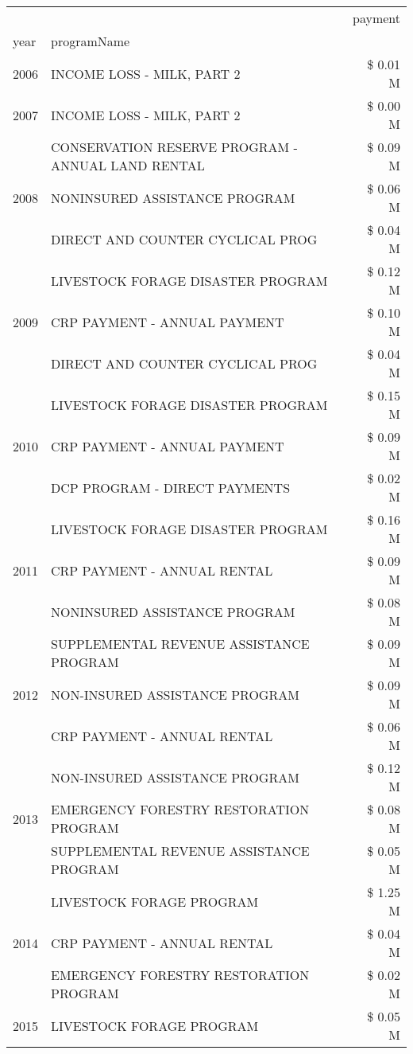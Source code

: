 \begin{tabular}{llr}
\toprule
 &  & payment \\
year & programName &  \\
\midrule
2006 & INCOME LOSS - MILK, PART 2 & \$ 0.01 M \\
\cline{1-3}
2007 & INCOME LOSS - MILK, PART 2 & \$ 0.00 M \\
\cline{1-3}
\multirow[t]{3}{*}{2008} & CONSERVATION RESERVE PROGRAM - ANNUAL LAND RENTAL & \$ 0.09 M \\
 & NONINSURED ASSISTANCE PROGRAM & \$ 0.06 M \\
 & DIRECT AND COUNTER CYCLICAL PROG & \$ 0.04 M \\
\cline{1-3}
\multirow[t]{3}{*}{2009} & LIVESTOCK FORAGE DISASTER  PROGRAM & \$ 0.12 M \\
 & CRP PAYMENT - ANNUAL PAYMENT & \$ 0.10 M \\
 & DIRECT AND COUNTER CYCLICAL PROG & \$ 0.04 M \\
\cline{1-3}
\multirow[t]{3}{*}{2010} & LIVESTOCK FORAGE DISASTER  PROGRAM & \$ 0.15 M \\
 & CRP PAYMENT - ANNUAL PAYMENT & \$ 0.09 M \\
 & DCP PROGRAM - DIRECT PAYMENTS & \$ 0.02 M \\
\cline{1-3}
\multirow[t]{3}{*}{2011} & LIVESTOCK FORAGE DISASTER PROGRAM & \$ 0.16 M \\
 & CRP PAYMENT - ANNUAL RENTAL & \$ 0.09 M \\
 & NONINSURED ASSISTANCE PROGRAM & \$ 0.08 M \\
\cline{1-3}
\multirow[t]{3}{*}{2012} & SUPPLEMENTAL REVENUE ASSISTANCE PROGRAM & \$ 0.09 M \\
 & NON-INSURED ASSISTANCE PROGRAM & \$ 0.09 M \\
 & CRP PAYMENT - ANNUAL RENTAL & \$ 0.06 M \\
\cline{1-3}
\multirow[t]{3}{*}{2013} & NON-INSURED ASSISTANCE PROGRAM & \$ 0.12 M \\
 & EMERGENCY FORESTRY RESTORATION PROGRAM & \$ 0.08 M \\
 & SUPPLEMENTAL REVENUE ASSISTANCE PROGRAM & \$ 0.05 M \\
\cline{1-3}
\multirow[t]{3}{*}{2014} & LIVESTOCK FORAGE PROGRAM & \$ 1.25 M \\
 & CRP PAYMENT - ANNUAL RENTAL & \$ 0.04 M \\
 & EMERGENCY FORESTRY RESTORATION PROGRAM & \$ 0.02 M \\
\cline{1-3}
\multirow[t]{3}{*}{2015} & LIVESTOCK FORAGE PROGRAM & \$ 0.05 M \\

\end{tabular}
